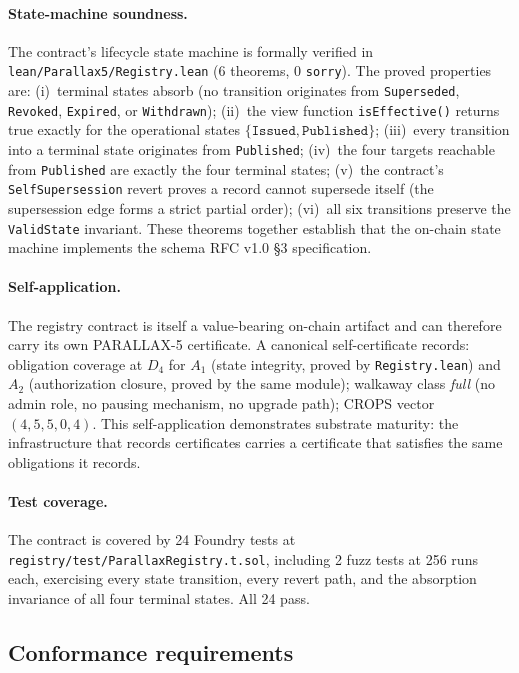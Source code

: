 \documentclass[11pt,a4paper]{article}
\begin{document}
\paragraph{State-machine soundness.} The contract's lifecycle state machine is formally verified in \texttt{lean/Parallax5/Registry.lean} (6 theorems, 0 \texttt{sorry}). The proved properties are: (i)~terminal states absorb (no transition originates from \texttt{Superseded}, \texttt{Revoked}, \texttt{Expired}, or \texttt{Withdrawn}); (ii)~the view function \texttt{isEffective()} returns true exactly for the operational states $\{\texttt{Issued}, \texttt{Published}\}$; (iii)~every transition into a terminal state originates from \texttt{Published}; (iv)~the four targets reachable from \texttt{Published} are exactly the four terminal states; (v)~the contract's \texttt{SelfSupersession} revert proves a record cannot supersede itself (the supersession edge forms a strict partial order); (vi)~all six transitions preserve the \texttt{ValidState} invariant. These theorems together establish that the on-chain state machine implements the schema RFC v1.0 \S3 specification.

\paragraph{Self-application.} The registry contract is itself a value-bearing on-chain artifact and can therefore carry its own PARALLAX-5 certificate. A canonical self-certificate records: obligation coverage at $D_4$ for $A_1$ (state integrity, proved by \texttt{Registry.lean}) and $A_2$ (authorization closure, proved by the same module); walkaway class \emph{full} (no admin role, no pausing mechanism, no upgrade path); CROPS vector $(4, 5, 5, 0, 4)$. This self-application demonstrates substrate maturity: the infrastructure that records certificates carries a certificate that satisfies the same obligations it records.

\paragraph{Test coverage.} The contract is covered by 24 Foundry tests at \texttt{registry/test/ParallaxRegistry.t.sol}, including 2 fuzz tests at 256 runs each, exercising every state transition, every revert path, and the absorption invariance of all four terminal states. All 24 pass.

\subsection{Conformance requirements}
\end{document}
